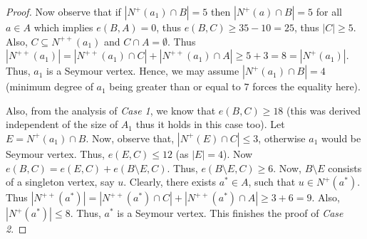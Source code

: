 \documentclass[10pt,a4paper]{amsart}
\begin{document}
\begin{proof}
Now observe that if $|N^+(a_1)\cap B|=5$ then $|N^+(a)\cap B|=5$ for all $a\in A$ which implies $e(B,A)=0$, thus $e(B,C)\geq 35-10=25$, thus $|C|\geq 5$. Also, $C\subseteq N^{++}(a_1)$ and $C\cap A=\emptyset$. Thus $|N^{++}(a_1)|=|N^{++}(a_1)\cap C| + |N^{++}(a_1)\cap A|\geq 5+3=8=|N^+(a_1)|$. Thus, $a_1$ is a Seymour vertex. Hence, we may assume $|N^{+}(a_1)\cap B|=4$ (minimum degree of $a_1$ being greater than or equal to $7$ forces the equality here).

Also, from the analysis of \emph{Case 1}, we know that $e(B,C)\geq 18$ (this was derived independent of the size of $A_1$ thus it holds in this case too). Let $E=N^{+}(a_1)\cap B$. Now, observe that, $|N^+(E)\cap C|\leq 3$, otherwise $a_1$ would be Seymour vertex. Thus, $e(E,C)\leq 12$ (as $|E|=4$). Now $e(B,C)=e(E,C)+e(B\setminus E,C)$. Thus, $e(B\setminus E,C)\geq 6$. Now, $B\setminus E$ consists of a singleton vertex, say $u$. Clearly, there exists $a^*\in A$, such that $u\in N^+(a^*)$. Thus $|N^{++}(a^*)|=|N^{++}(a^*)\cap C| + |N^{++}(a^*)\cap A|\geq 3+6=9$. Also, $|N^+(a^*)|\leq 8$. Thus, $a^*$ is a Seymour vertex. This finishes the proof of \emph{Case 2}.




\end{proof}
\end{document}
